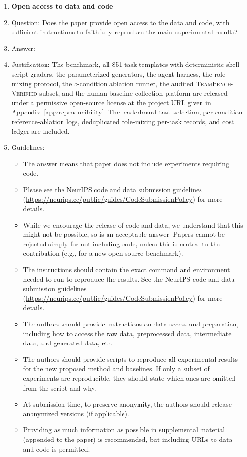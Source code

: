 \begin{enumerate}
\item {\bf Open access to data and code}
    \item[] Question: Does the paper provide open access to the data and code, with sufficient instructions to faithfully reproduce the main experimental results?
    \item[] Answer: \answerYes{}
    \item[] Justification: The benchmark, all 851 task templates with deterministic shell-script graders, the parameterized generators, the agent harness, the role-mixing protocol, the 5-condition ablation runner, the audited \textsc{TeamBench-Verified} subset, and the human-baseline collection platform are released under a permissive open-source license at the project URL given in Appendix~\ref{app:reproducibility}. The leaderboard task selection, per-condition reference-ablation logs, deduplicated role-mixing per-task records, and cost ledger are included.
    \item[] Guidelines:
    \begin{itemize}
        \item The answer \answerNA{} means that paper does not include experiments requiring code.
        \item Please see the NeurIPS code and data submission guidelines (\url{https://neurips.cc/public/guides/CodeSubmissionPolicy}) for more details.
        \item While we encourage the release of code and data, we understand that this might not be possible, so \answerNo{} is an acceptable answer. Papers cannot be rejected simply for not including code, unless this is central to the contribution (e.g., for a new open-source benchmark).
        \item The instructions should contain the exact command and environment needed to run to reproduce the results. See the NeurIPS code and data submission guidelines (\url{https://neurips.cc/public/guides/CodeSubmissionPolicy}) for more details.
        \item The authors should provide instructions on data access and preparation, including how to access the raw data, preprocessed data, intermediate data, and generated data, etc.
        \item The authors should provide scripts to reproduce all experimental results for the new proposed method and baselines. If only a subset of experiments are reproducible, they should state which ones are omitted from the script and why.
        \item At submission time, to preserve anonymity, the authors should release anonymized versions (if applicable).
        \item Providing as much information as possible in supplemental material (appended to the paper) is recommended, but including URLs to data and code is permitted.
    \end{itemize}


\end{enumerate}
